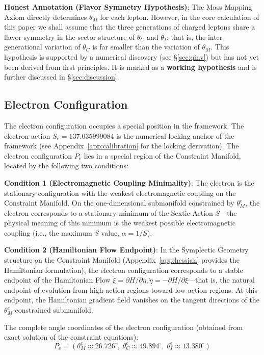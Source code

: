 \documentclass[aps,prd,reprint,nofootinbib]{revtex4-2}
\begin{document}
\textbf{Honest Annotation (Flavor Symmetry Hypothesis)}: The Mass Mapping Axiom directly determines $\theta_M$ for each lepton. However, in the core calculation of this paper we shall assume that the three generations of charged leptons share a flavor symmetry in the sector structure of $\theta_C$ and $\theta_I$: that is, the inter-generational variation of $\theta_C$ is far smaller than the variation of $\theta_M$. This hypothesis is supported by a numerical discovery (see \S\ref{sec:qinv}) but has not yet been derived from first principles. It is marked as a \textbf{working hypothesis} and is further discussed in \S\ref{sec:discussion}.

\subsection{Electron Configuration}

The electron configuration occupies a special position in the framework. The electron action $S_e = 137.035999084$ is the numerical locking anchor of the framework (see Appendix~\ref{app:calibration} for the locking derivation). The electron configuration $P_e$ lies in a special region of the Constraint Manifold, located by the following two conditions:

\textbf{Condition 1 (Electromagnetic Coupling Minimality)}: The electron is the stationary configuration with the weakest electromagnetic coupling on the Constraint Manifold. On the one-dimensional submanifold constrained by $\theta_M^e$, the electron corresponds to a stationary minimum of the Sextic Action $S$---the physical meaning of this minimum is the weakest possible electromagnetic coupling (i.e., the maximum $S$ value, $\alpha = 1/S$).

\textbf{Condition 2 (Hamiltonian Flow Endpoint)}: In the Symplectic Geometry structure on the Constraint Manifold (Appendix~\ref{app:hessian} provides the Hamiltonian formulation), the electron configuration corresponds to a stable endpoint of the Hamiltonian Flow $\dot{\xi} = \partial H/\partial\eta, \dot{\eta} = -\partial H/\partial\xi$---that is, the natural endpoint of evolution from high-action regions toward low-action regions. At this endpoint, the Hamiltonian gradient field vanishes on the tangent directions of the $\theta_M^e$-constrained submanifold.

The complete angle coordinates of the electron configuration (obtained from exact solution of the constraint equations):
\begin{equation}
\boxed{P_e = (\theta_M^e \approx 26.726^\circ,\; \theta_C^e \approx 49.894^\circ,\; \theta_I^e \approx 13.380^\circ)} \label{eq:electron}
\end{equation}
\end{document}
